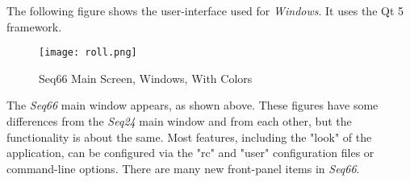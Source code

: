 \documentclass[
 11pt,
 twoside,
 a4paper,
 headinclude,
 footinclude,
 final                                 %
]{article}
\begin{document}
   The following figure shows the user-interface used for
   \textsl{Windows}.  It uses the Qt 5 framework.


\begin{figure}[H]
   \centering 
   \texttt{[image: roll.png]}
   \caption{Seq66 Main Screen, Windows, With Colors}
   \label{fig:seq66_main_screen_qt}
\end{figure}

   The \textsl{Seq66} main window appears, as shown above.
   These figures have some differences from the \textsl{Seq24} main window
   and from each other, but the functionality is about the same.
   Most features, including the "look" of the application,
   can be configured via the "rc" and "user"
   configuration files or command-line options.
   There are many new front-panel items in \textsl{Seq66}.

\end{document}
